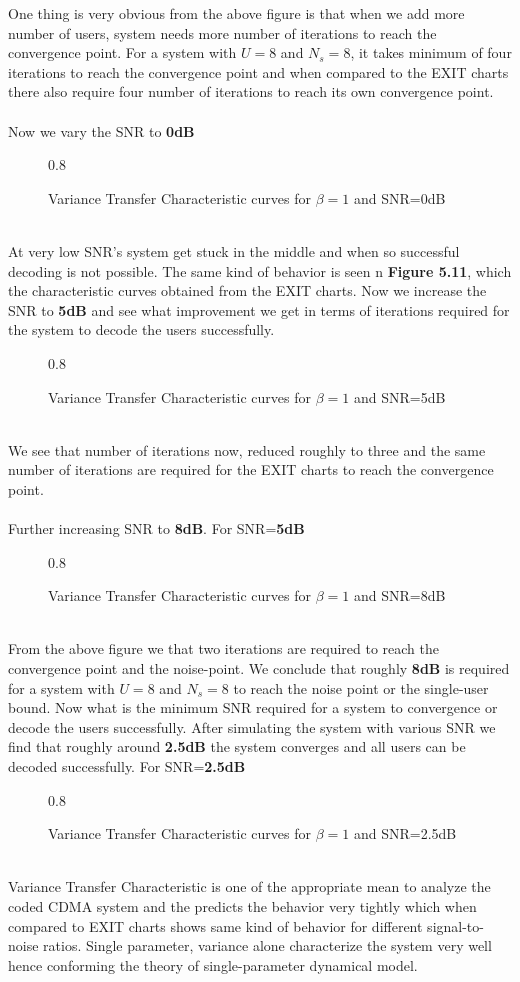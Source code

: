 One thing is very obvious from the above figure is that when we add more number of users, system needs more number of iterations to reach the convergence point. For a system with $U=8$ and $N_s=8$, it takes minimum of four iterations to reach the convergence point and when compared to the EXIT charts there also require four number of iterations to reach its own convergence point.\\ \\
Now we vary the SNR to \textbf{0dB}
\begin{figure}[htb]
\centerline{  {0.8} }
\caption{Variance Transfer Characteristic curves for $\beta=1$ and SNR=0dB}
\end{figure}\\
At very low SNR's system get stuck in the middle and when so successful decoding is not possible. The same kind of behavior is seen n \textbf{Figure 5.11}, which the characteristic curves obtained from the EXIT charts.
\newpage
Now we increase the SNR to \textbf{5dB} and see what improvement we get in terms of iterations required for the system to decode the users successfully.
\begin{figure}[htb]
\centerline{  {0.8} }
\caption{Variance Transfer Characteristic curves for $\beta=1$ and SNR=5dB}
\end{figure}\\
We see that number of iterations now, reduced roughly to three and the same number of iterations are required for the EXIT charts to reach the convergence point. \\ \\
Further increasing SNR to \textbf{8dB}.
For SNR=\textbf{5dB} 
\begin{figure}[htb]
\centerline{  {0.8} }
\caption{Variance Transfer Characteristic curves for $\beta=1$ and SNR=8dB}
\end{figure}\\
From the above figure we that two iterations are required to reach the convergence point and the noise-point. We conclude that roughly \textbf{8dB} is required for a system with $U=8$ and $N_s=8$ to reach the noise point or the single-user bound.
\newpage
Now what is the minimum SNR required for a system to convergence or decode the users successfully. After simulating the system with various SNR we find that roughly around \textbf{2.5dB} the system converges and all users can be decoded successfully.
For SNR=\textbf{2.5dB} 
\begin{figure}[htb]
\centerline{  {0.8} }
\caption{Variance Transfer Characteristic curves for $\beta=1$ and SNR=2.5dB}
\end{figure}\\
Variance Transfer Characteristic is one of the appropriate mean to analyze the coded CDMA system and the predicts the behavior very tightly which when compared to EXIT charts shows same kind of behavior for different signal-to-noise ratios. Single parameter, variance alone characterize the system very well hence conforming the theory of single-parameter dynamical model.
